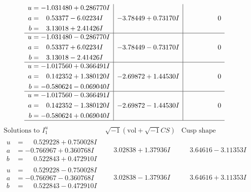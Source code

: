 \documentclass[1p]{elsarticle_modified}
\theoremstyle{definition}
\newcommand{\I}{\sqrt{-1}}
\begin{document}
$$\begin{array}{c|c|c}
\begin{aligned}
u &= -1.031480 + 0.286770 I \\
a &= \phantom{-}0.53377 - 6.02234 I \\
b &= \phantom{-}3.13018 + 2.41426 I\end{aligned}
 & -3.78449 + 0.73170 I & \phantom{-0.000000 } 0 \\ \hline\begin{aligned}
u &= -1.031480 - 0.286770 I \\
a &= \phantom{-}0.53377 + 6.02234 I \\
b &= \phantom{-}3.13018 - 2.41426 I\end{aligned}
 & -3.78449 - 0.73170 I & \phantom{-0.000000 } 0 \\ \hline\begin{aligned}
u &= -1.017560 + 0.366491 I \\
a &= \phantom{-}0.142352 + 1.380120 I \\
b &= -0.580624 - 0.069040 I\end{aligned}
 & -2.69872 + 1.44530 I & \phantom{-0.000000 } 0 \\ \hline\begin{aligned}
u &= -1.017560 - 0.366491 I \\
a &= \phantom{-}0.142352 - 1.380120 I \\
b &= -0.580624 + 0.069040 I\end{aligned}
 & -2.69872 - 1.44530 I & \phantom{-0.000000 } 0\\
 \hline 
 \end{array}$$\newpage$$\begin{array}{c|c|c}  
\text{Solutions to }I^u_{1}& \I (\text{vol} + \sqrt{-1}CS) & \text{Cusp shape}\\
 \hline 
\begin{aligned}
u &= \phantom{-}0.529228 + 0.750028 I \\
a &= -0.766967 + 0.360768 I \\
b &= \phantom{-}0.522843 + 0.472910 I\end{aligned}
 & \phantom{-}3.02838 + 1.37936 I & \phantom{-}3.64616 - 3.11353 I \\ \hline\begin{aligned}
u &= \phantom{-}0.529228 - 0.750028 I \\
a &= -0.766967 - 0.360768 I \\
b &= \phantom{-}0.522843 - 0.472910 I\end{aligned}
 & \phantom{-}3.02838 - 1.37936 I & \phantom{-}3.64616 + 3.11353 I \\ \hline\begin{aligned}

\end{aligned}
\end{array}$$
\end{document}
